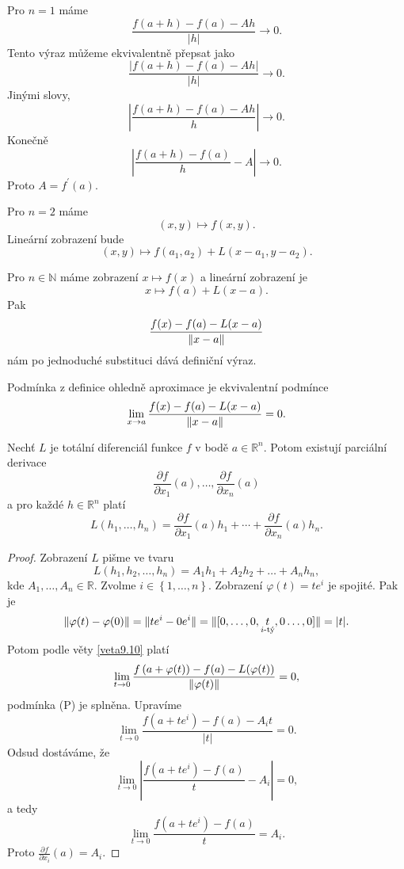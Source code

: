 \begin{poznamka}
	Pro $n=1$ máme
	$$
 \frac{f(a+h)-f(a)-Ah}{|h|} \to 0.
	$$
	Tento výraz můžeme ekvivalentně přepsat jako
	$$
 \frac{|f(a+h)-f(a)-Ah|}{|h|} \to 0.
	$$
	Jinými slovy,
	$$
	    \left |\frac{f(a+h)-f(a)-Ah}{h}\right | \to 0.
	$$
	Konečně
	$$
	    \left |\frac{f(a+h)-f(a)}{h} - A\right | \to 0.
	$$
	Proto $A=f^\prime(a)$.
	\par Pro $n=2$ máme
	$$
	    (x,y)\mapsto f(x,y).
	$$
	Lineární zobrazení bude
	$$
	    (x,y)\mapsto f(a_1,a_2) + L(x-a_1,y-a_2).
	$$
	\par Pro $n \in \mathbb N $ máme zobrazení $x \mapsto f(x)$ a lineární zobrazení je
	$$
	    x \mapsto f(a)+L(x-a).
	$$
	Pak
	$$
 \frac{f(x)-f(a)-L(x-a)}{\lVert x-a \rVert}
	$$
	nám po jednoduché substituci dává definiční výraz.
\end{poznamka}

\begin{poznamka}
	Podmínka z definice ohledně aproximace je ekvivalentní podmínce
	$$
 \lim_{x\to a } \frac{f(x)-f(a)-L(x-a)}{\lVert x-a \rVert}=0.
	$$
\end{poznamka}

\begin{veta}\label{veta10.1}
Nechť $L$ je totální diferenciál funkce
$f$ v bodě $a\in\mathbb{R}^n$.
Potom existují parciální derivace
\[
\frac{\partial f}{\partial x_1}(a),
\dots,
\frac{\partial f}{\partial x_n}(a)
\]
a pro každé $h\in\mathbb{R}^n$ platí
\[
L(h_1,\dots,h_n)
=
\frac{\partial f}{\partial x_1}(a)h_1
+\cdots+
\frac{\partial f}{\partial x_n}(a)h_n.
\]
\end{veta}

\begin{proof}
	Zobrazení $L$ pišme ve tvaru
	$$
	    L(h_1,h_2,\dots,h_n)=A_1h_1+ A_2h_2 + \dots + A_nh_n,
	$$
	kde $A_1,\dots,A_n \in \mathbb R $. Zvolme $i \in \left \{ 1,\dots,n \right \} $.
	Zobrazení $\varphi(t)=te^i$ je spojité. Pak je
	$$
	    \lVert \varphi(t)-\varphi(0) \rVert=\lVert te^i-0e^i \rVert = \lVert  [ 0,\dots, 0, \underset{i\text{-tý}}{t},0\dots,0 ]  \rVert=|t|.
	$$
	Potom podle věty \ref{veta9.10} platí
	$$
 \lim_{t\to 0} \frac{f \left( a+\varphi(t)) - f(a) -L(\varphi(t) \right ) }{\lVert \varphi(t) \rVert} = 0,
	$$
	podmínka (P) je splněna. Upravíme
	$$
 \lim_{t\to 0} \frac{f(a+te^i)-f(a)-A_it}{|t|}=0.
	$$
	Odsud dostáváme, že
	$$
 \lim_{t \to 0} \left | \frac{f(a+te^i)-f(a)}{t}-A_i \right | = 0,
	$$
	a tedy
	$$
	\lim_{t \to 0} \frac{f(a+te^i) - f(a)}{t} = A_i.
	$$
	Proto $\frac{\partial f }{\partial x_i}(a)=A_i$.
\end{proof}

